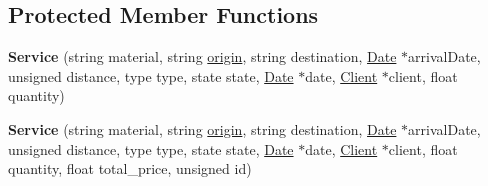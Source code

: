 \subsection*{Protected Member Functions}
\begin{DoxyCompactItemize}
\item 
\mbox{\label{class_service_a1b3d554287523d558d4d38814c24d591}} 
{\bfseries Service} (string material, string \hyperlink{class_service_a0e23ac4930720ab597a5c584703151f9}{origin}, string destination, \hyperlink{class_date}{Date} $\ast$arrival\+Date, unsigned distance, type type, state state, \hyperlink{class_date}{Date} $\ast$date, \hyperlink{class_client}{Client} $\ast$client, float quantity)
\item 
\mbox{\label{class_service_aa8037c739c084ca5f12d25de6316d5ca}} 
{\bfseries Service} (string material, string \hyperlink{class_service_a0e23ac4930720ab597a5c584703151f9}{origin}, string destination, \hyperlink{class_date}{Date} $\ast$arrival\+Date, unsigned distance, type type, state state, \hyperlink{class_date}{Date} $\ast$date, \hyperlink{class_client}{Client} $\ast$client, float quantity, float total\+\_\+price, unsigned id)
\end{DoxyCompactItemize}
